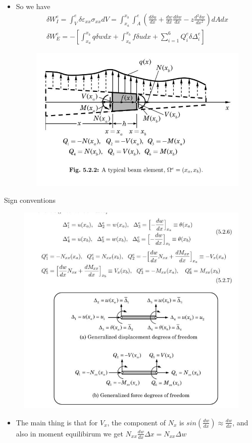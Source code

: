 	\begin{frame}
		\begin{itemize}
			\item So we have
			\begin{equation}
			\begin{aligned}
			\delta W_I^e = \int_V^e \delta \varepsilon_{xx} \sigma_{xx} dV = \int_{x_a}^{x_b} \int_A^e \left(\frac{d \delta u}{dx} + \frac{dw}{dx}\frac{d\delta w}{dx} - z \frac{d^2\delta w}{dx^2} \right) dA dx \\
			\delta W^e_E = - \left[\int_{x_a}^{x_b} q \delta w dx + \int_{x_a}^{x_b} f \delta u dx + \sum_{i=1}^{6}Q_i^e \delta \Delta_i^e \right] 
			\end{aligned}
			\end{equation}	
			\begin{figure}
				\centering
				\includegraphics[width=0.7\linewidth]{Figure/fig18} 		
			\end{figure}
			
		\end{itemize}
	\end{frame}


	\begin{frame}{Sign conventions}
		\begin{figure}
			\centering
			\includegraphics[width=0.6 \linewidth]{Figure/fig19} 		
		\end{figure}	
		\begin{itemize}
			\item The main thing is that for $V_x$, the component of $N_x$ is $sin(\frac{dw}{dx}) \approx \frac{dw}{dx}$, and also in moment equilibirum we get $N_{xx}\frac{dw}{dx}\Delta x = N_{xx}\Delta w$
			
		\end{itemize}
	\end{frame}


